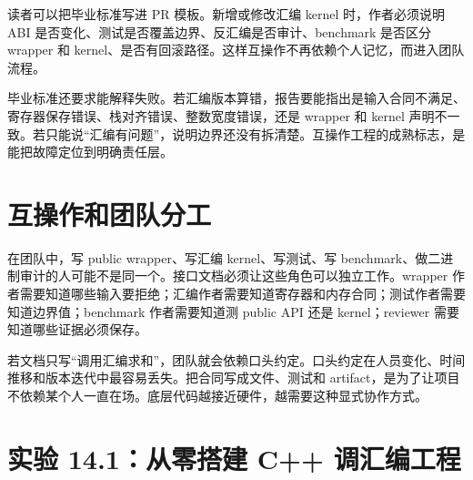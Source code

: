 读者可以把毕业标准写进 PR 模板。新增或修改汇编 kernel 时，作者必须说明 ABI 是否变化、测试是否覆盖边界、反汇编是否审计、benchmark 是否区分 wrapper 和 kernel、是否有回滚路径。这样互操作不再依赖个人记忆，而进入团队流程。

毕业标准还要求能解释失败。若汇编版本算错，报告要能指出是输入合同不满足、寄存器保存错误、栈对齐错误、整数宽度错误，还是 wrapper 和 kernel 声明不一致。若只能说“汇编有问题”，说明边界还没有拆清楚。互操作工程的成熟标志，是能把故障定位到明确责任层。

\section{互操作和团队分工}

在团队中，写 public wrapper、写汇编 kernel、写测试、写 benchmark、做二进制审计的人可能不是同一个。接口文档必须让这些角色可以独立工作。wrapper 作者需要知道哪些输入要拒绝；汇编作者需要知道寄存器和内存合同；测试作者需要知道边界值；benchmark 作者需要知道测 public API 还是 kernel；reviewer 需要知道哪些证据必须保存。

若文档只写“调用汇编求和”，团队就会依赖口头约定。口头约定在人员变化、时间推移和版本迭代中最容易丢失。把合同写成文件、测试和 artifact，是为了让项目不依赖某个人一直在场。底层代码越接近硬件，越需要这种显式协作方式。

\section{实验 14.1：从零搭建 C++ 调汇编工程}

